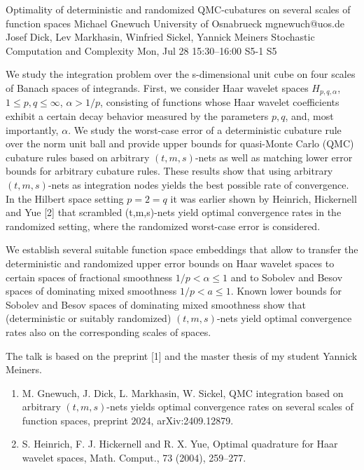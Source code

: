 \documentclass[12pt,lettersize,oneside]{book} %
\begin{document}
\begin{talk}
  {Optimality of deterministic and randomized QMC-cubatures on several scales of function spaces}%
  {Michael Gnewuch}%
  {University of Osnabrueck}%
  {mgnewuch@uos.de}%
  {Josef Dick, Lev Markhasin, Winfried Sickel, Yannick Meiners}%
  {Stochastic Computation and Complexity}%
  {Mon, Jul 28 15:30--16:00}%
  {S5-1}%
  {S5}%
    
   
   
We study the integration problem over the s-dimensional unit cube on four scales of Banach spaces of integrands. First, we consider Haar wavelet spaces $H_{p, q, \alpha}$, $1\le p, q \le \infty$, $\alpha > 1/p$, consisting of functions whose Haar wavelet coefficients exhibit a certain decay behavior measured by the parameters $p,q$, and, most importantly, $\alpha$.  We study the worst-case error of a deterministic cubature rule over the norm unit ball 
and provide upper bounds for quasi-Monte Carlo (QMC) cubature rules based on arbitrary $(t,m,s)$-nets as well as matching lower error bounds for arbitrary cubature rules. These results show that using arbitrary $(t,m,s)$-nets as integration nodes yields the best possible rate of convergence. In the Hilbert space setting $p=2 = q$ it was earlier shown by Heinrich, Hickernell and Yue [2]  that scrambled (t,m,s)-nets yield optimal convergence rates in the randomized setting, where the randomized worst-case error is considered. 

We establish several suitable function space embeddings that allow to transfer the deterministic and randomized upper error bounds on Haar wavelet spaces
to certain spaces of fractional smoothness $1/p < \alpha  \le 1$ and to Sobolev and Besov spaces of dominating mixed smoothness $1/p < a \le 1$.
Known lower bounds for Sobolev and Besov spaces of dominating mixed smoothness show that (deterministic or suitably randomized) $(t,m,s)$-nets yield optimal convergence rates also on the corresponding scales of spaces.   

The talk is based on the preprint [1] and the master thesis of my student Yannick Meiners.
\medskip

\begin{enumerate}
 \item[{[1]}] M. Gnewuch, J. Dick, L. Markhasin, W. Sickel, QMC integration based on arbitrary $(t,m,s)$-nets yields optimal convergence rates on several scales of function spaces, preprint 2024, arXiv:2409.12879. 
        \item[{[2]}] S. Heinrich, F. J. Hickernell and R. X. Yue, Optimal quadrature for Haar wavelet spaces, Math. Comput., 73 (2004), 259--277.
 \end{enumerate}
\end{talk}
\end{document}
